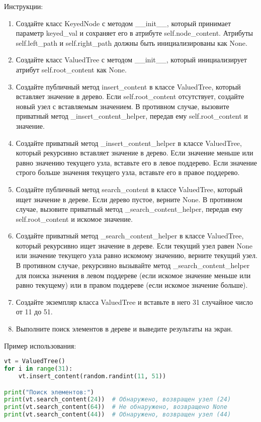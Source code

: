 \begin{enumerate}
Инструкции:
\begin{enumerate}
    \item Создайте класс KeyedNode с методом \_\_init\_\_, который принимает параметр keyed\_val и сохраняет его в атрибуте self.node\_content. Атрибуты self.left\_path и self.right\_path должны быть инициализированы как None.
    \item Создайте класс ValuedTree с методом \_\_init\_\_, который инициализирует атрибут self.root\_content как None.
    \item Создайте публичный метод insert\_content в классе ValuedTree, который вставляет значение в дерево. Если self.root\_content отсутствует, создайте новый узел с вставляемым значением. В противном случае, вызовите приватный метод \_insert\_content\_helper, передав ему self.root\_content и значение.
    \item Создайте приватный метод \_insert\_content\_helper в классе ValuedTree, который рекурсивно вставляет значение в дерево. Если значение меньше или равно значению текущего узла, вставьте его в левое поддерево. Если значение строго больше значения текущего узла, вставьте его в правое поддерево.
    \item Создайте публичный метод search\_content в классе ValuedTree, который ищет значение в дереве. Если дерево пустое, верните None. В противном случае, вызовите приватный метод \_search\_content\_helper, передав ему self.root\_content и искомое значение.
    \item Создайте приватный метод \_search\_content\_helper в классе ValuedTree, который рекурсивно ищет значение в дереве. Если текущий узел равен None или значение текущего узла равно искомому значению, верните текущий узел. В противном случае, рекурсивно вызывайте метод \_search\_content\_helper для поиска значения в левом поддереве (если искомое значение меньше или равно текущему) или в правом поддереве (если искомое значение больше).
    \item Создайте экземпляр класса ValuedTree и вставьте в него 31 случайное число от 11 до 51.
    \item Выполните поиск элементов в дереве и выведите результаты на экран.
\end{enumerate}

Пример использования:
\begin{lstlisting}[language=Python]
vt = ValuedTree()
for i in range(31):
    vt.insert_content(random.randint(11, 51))

print("Поиск элементов:")
print(vt.search_content(24))  # Обнаружено, возвращен узел (24)
print(vt.search_content(64))  # Не обнаружено, возвращено None
print(vt.search_content(44))  # Обнаружено, возвращен узел (44)
\end{lstlisting}


\end{enumerate}
